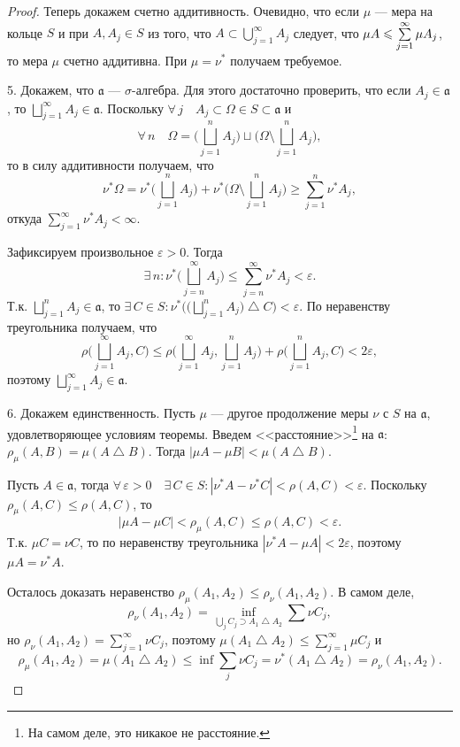 \documentclass[12pt,titlepage]{article}
\theoremstyle{definition}
\newcommand*{\p}[1]{#1\nobreak\discretionary{}{\hbox{$\mathsurround=0pt #1$}}{}}
\begin{document}
\begin{proof}
Теперь докажем счетно аддитивность. Очевидно, что если $\mu$ ---
мера на кольце $S$ и при $A,A_j\in S$ из того, что
$A\subset\bigcup\limits_{j=1}^\infty A_j$ следует, что $\mu
A\p\leqslant\sum\limits_{j=1}^\infty\mu A_j$, то мера $\mu$ счетно
аддитивна. При $\mu=\nu^*$ получаем требуемое.

5. Докажем, что $\mathfrak{a}$ --- $\sigma$-алгебра. Для этого
достаточно проверить, что если $A_j\in\mathfrak{a}$, то
$\bigsqcup\limits_{j=1}^\infty A_j\in\mathfrak{a}$. Поскольку
$\forall\, j\quad A_j\subset\Omega\in S\subset\mathfrak{a}$ и
$$\forall\, n\quad\Omega=\Big(\bigsqcup\limits_{j=1}^n
A_j\Big)\sqcup\Big(\Omega\setminus\bigsqcup\limits_{j=1}^n
A_j\Big),$$ то в силу аддитивности получаем, что
$$\nu^*\Omega=\nu^*\Big(\bigsqcup\limits_{j=1}^n A_j\Big)+\nu^*\Big
(\Omega\setminus\bigsqcup\limits_{j=1}^n
A_j\Big)\geqslant\sum\limits_{j=1}^n\nu^* A_j,$$ откуда
$\sum\limits_{j=1}^\infty \nu^*A_j<\infty$.

Зафиксируем произвольное $\varepsilon>0$. Тогда $$\exists\,
n:\nu^*\Big(\bigsqcup\limits_{j=n}^\infty
A_j\Big)\leqslant\sum\limits_{j=n}^\infty\nu^*A_j<\varepsilon.$$
Т.к. $\bigsqcup\limits_{j=1}^n A_j\in\mathfrak{a}$, то $\exists\,
C\in S:\nu^*\Big(\Big(\bigsqcup\limits_{j=1}^n
A_j\Big)\bigtriangleup C\Big)<\varepsilon$. По неравенству
треугольника получаем, что
$$\rho\Big(\bigsqcup\limits_{j=1}^\infty A_j,C\Big)\leqslant
\rho\Big(\bigsqcup\limits_{j=1}^\infty A_j,\bigsqcup\limits_{j=1}^n
A_j\Big)+\rho\Big(\bigsqcup\limits_{j=1}^n A_j,
C\Big)<2\varepsilon,$$ поэтому $\bigsqcup\limits_{j=1}^\infty
A_j\in\mathfrak{a}$.

6. Докажем единственность. Пусть $\mu$ --- другое продолжение меры
$\nu$ с $S$ на $\mathfrak{a}$, удовлетворяющее условиям теоремы.
Введем <<расстояние>>\footnote{На самом деле, это никакое не
расстояние.} на $\mathfrak{a}$: $\rho_\mu(A,B)=\mu(A\bigtriangleup
B)$. Тогда $|\mu A-\mu B|<\mu(A\bigtriangleup B)$.

Пусть $A\in\mathfrak{a}$, тогда
$\forall\,\varepsilon>0\quad\exists\, C\in S:
|\nu^*A-\nu^*C|<\rho(A,C)<\varepsilon$. Поскольку
$\rho_\mu(A,C)\leqslant\rho(A,C)$, то $$|\mu A-\mu
C|<\rho_\mu(A,C)\leqslant\rho(A,C)<\varepsilon.$$ Т.к. $\mu C=\nu
C$, то по неравенству треугольника $|\nu^* A-\mu A|<2\varepsilon$,
поэтому $\mu A=\nu^*A$.

Осталось доказать неравенство
$\rho_\mu(A_1,A_2)\leqslant\rho_\nu(A_1,A_2)$. В самом деле,
$$\rho_\nu(A_1,A_2)=\inf\limits_{\bigcup\limits_j C_j\supset A_1
\bigtriangleup A_2} \sum\nu C_j,$$ но
$\rho_\nu(A_1,A_2)=\sum\limits_{j=1}^\infty \nu C_j$, поэтому
$\mu(A_1\bigtriangleup A_2)\leqslant\sum\limits_{j=1}^\infty \mu
C_j$ и $$\rho_\mu(A_1,A_2)=\mu(A_1\bigtriangleup
A_2)\leqslant\inf\sum\limits_j \nu C_j=\nu^*(A_1\bigtriangleup
A_2)=\rho_\nu(A_1,A_2).$$
\end{proof}
\end{document}
